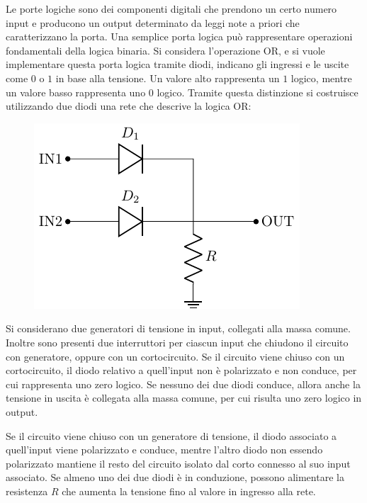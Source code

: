 \documentclass{article}
\numberwithin{equation}{subsection}
\begin{document}
Le porte logiche sono dei componenti digitali che prendono un certo numero input e producono un output determinato da leggi note a priori che caratterizzano la porta. 
Una semplice porta logica può rappresentare operazioni fondamentali della logica binaria. Si considera l'operazione OR, e si vuole implementare questa porta 
logica tramite diodi, indicano gli ingressi e le uscite come $0$ o $1$ in base alla tensione. Un valore alto rappresenta un $1$ logico, mentre un valore basso rappresenta 
uno $0$ logico. Tramite questa distinzione si costruisce utilizzando due diodi una rete che descrive la logica OR:
\begin{figure}[H]%
    \centering
    \includegraphics{circuito-or.pdf}%
    \label{fig:circuito-or}
\end{figure}
Si considerano due generatori di tensione in input, collegati alla massa comune. Inoltre sono presenti due interruttori per ciascun input che chiudono il 
circuito con generatore, oppure con un cortocircuito. Se il circuito viene chiuso con un cortocircuito, il diodo relativo a quell'input non è polarizzato 
e non conduce, per cui rappresenta uno zero logico. 
Se nessuno dei due diodi conduce, allora anche la tensione in uscita è collegata alla massa comune, per cui risulta uno zero logico in output. 

Se il circuito viene chiuso con un generatore di tensione, il diodo associato a quell'input viene polarizzato e conduce, mentre l'altro diodo non 
essendo polarizzato mantiene il resto del circuito isolato dal corto connesso al suo input associato. 
Se almeno uno dei due diodi è in conduzione, possono alimentare la resistenza $R$ che aumenta la tensione fino al valore in ingresso alla rete. 
\end{document}
